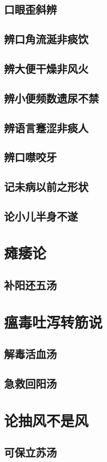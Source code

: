 \documentclass[a4paper,12pt,UTF8,twoside]{ctexbook}
\begin{document}
	\section{口眼歪斜辨}
	\section{辨口角流涎非痰饮}
	\section{辨大便干燥非风火}
	\section{辨小便频数遗尿不禁}
	\section{辨语言蹇涩非痰人}
	\section{辨口噤咬牙}
	\section{记未病以前之形状}
	\section{论小儿半身不遂}
	\chapter{瘫痿论}
	\section{补阳还五汤}
	\chapter{瘟毒吐泻转筋说}
	\section{解毒活血汤}
	\section{急救回阳汤}
	\chapter{论抽风不是风}
	\section{可保立苏汤}
\end{document}
